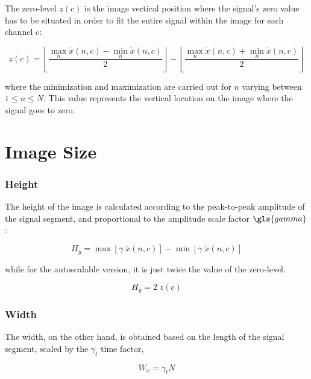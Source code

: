 The zero-level $z(c)$ is the image vertical position where the signal's zero value has to be situated in order to fit the entire signal within the image for each channel c:

\begin{equation}
z(c) = \left \lfloor{ \frac{\max_{n} \tilde{x}(n,c)  - \min_{n} \tilde{x}(n,c) }{2} }\right \rfloor -   \left \lfloor{ \frac{\max_{n} \tilde{x}(n,c)  + \min_{n} \tilde{x}(n,c)}{ 2} }\right \rfloor
\label{eq:zerolevel}
\end{equation}

\noindent where the minimization and maximization are carried out for $n$ varying between ${1 \leq n\leq N}$. This value represents the vertical location on the image where the signal goes to zero.  

\section{Image Size}

\subsubsection{Height}

The height of the image is calculated according to the peak-to-peak amplitude of the signal segment, and proportional to the amplitude scale factor $\gls{gamma}$:

\begin{equation}
H_y = \max \left\lfloor \gamma \; \tilde{x}(n,c) \right\rceil  - \min \left\lfloor \gamma \; \tilde{x}(n,c) \right\rceil 
\label{eq:height}
\end{equation}

\noindent while for the autoscalable version, it is just twice the value of the zero-level.

\begin{equation}
H_y = 2 \; z(c)
\label{eq:autoscaleheight}
\end{equation}


\subsubsection{Width}

The width, on the other hand, is obtained based on the length of the signal segment, scaled by the $\gamma_t$  time factor,

\begin{equation}
W_x = \gamma_t  N
\label{eq:width}
\end{equation}

